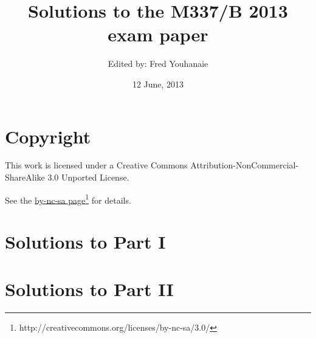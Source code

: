 \documentclass[a4paper,fleqn,12pt,twoside]{article}
\title{Solutions to the M337/B 2013 exam paper}
\author{Edited by: Fred Youhanaie}
\date{12 June, 2013}
\begin{document}
\maketitle

\pagestyle{myheadings}

\section*{Copyright}

This work is licensed under a Creative Commons
Attribution-NonCommercial-ShareAlike 3.0 Unported License.

\newcommand\cclink{http://creativecommons.org/licenses/by-nc-sa/3.0/}
See the \href{\cclink}{by-nc-sa page}\footnote{\cclink} for details.

\section*{Solutions to Part I}









\section*{Solutions to Part II}




\end{document}
